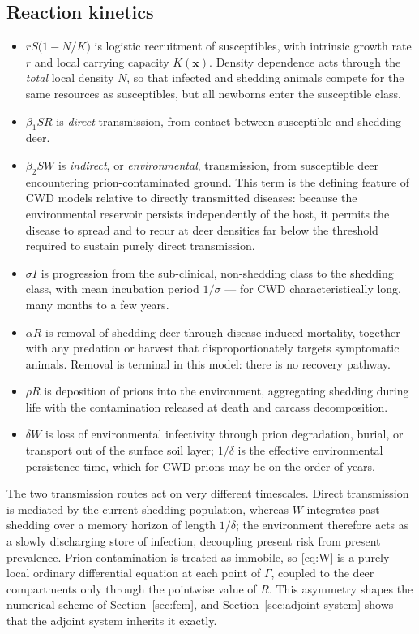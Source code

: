 \documentclass[11pt]{article}
\begin{document}
\subsection{Reaction kinetics}

\begin{itemize}
  \item $rS\big(1-N/K\big)$ is logistic recruitment of susceptibles, with intrinsic growth rate $r$ and local carrying capacity $K(\mathbf{x})$. Density dependence acts through the \emph{total} local density $N$, so that infected and shedding animals compete for the same resources as susceptibles, but all newborns enter the susceptible class.
  \item $\beta_1 S R$ is \emph{direct} transmission, from contact between susceptible and shedding deer.
  \item $\beta_2 S W$ is \emph{indirect}, or \emph{environmental}, transmission, from susceptible deer encountering prion-contaminated ground. This term is the defining feature of CWD models relative to directly transmitted diseases: because the environmental reservoir persists independently of the host, it permits the disease to spread and to recur at deer densities far below the threshold required to sustain purely direct transmission.
  \item $\sigma I$ is progression from the sub-clinical, non-shedding class to the shedding class, with mean incubation period $1/\sigma$ --- for CWD characteristically long, many months to a few years.
  \item $\alpha R$ is removal of shedding deer through disease-induced mortality, together with any predation or harvest that disproportionately targets symptomatic animals. Removal is terminal in this model: there is no recovery pathway.
  \item $\rho R$ is deposition of prions into the environment, aggregating shedding during life with the contamination released at death and carcass decomposition.
  \item $\delta W$ is loss of environmental infectivity through prion degradation, burial, or transport out of the surface soil layer; $1/\delta$ is the effective environmental persistence time, which for CWD prions may be on the order of years.
\end{itemize}

The two transmission routes act on very different timescales. Direct transmission is mediated by the current shedding population, whereas $W$ integrates past shedding over a memory horizon of length $1/\delta$; the environment therefore acts as a slowly discharging store of infection, decoupling present risk from present prevalence. Prion contamination is treated as immobile, so \eqref{eq:W} is a purely local ordinary differential equation at each point of $\Gamma$, coupled to the deer compartments only through the pointwise value of $R$. This asymmetry shapes the numerical scheme of Section~\ref{sec:fem}, and Section~\ref{sec:adjoint-system} shows that the adjoint system inherits it exactly.
\end{document}
